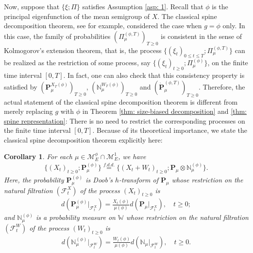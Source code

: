 \documentclass[12pt,a4paper]{amsart}
\newtheorem{cro}[thm]{Corollary}
\theoremstyle{definition}
\numberwithin{equation}{section}
\begin{document}
Now, suppose that $\{\xi; \Pi\}$ satisfies Assumption \ref{asp: 1}.
Recall that $\phi$ is the principal eigenfunction of the mean semigroup of $X$.
The classical spine decomposition theorem, see 
\cite{EckhoffKyprianouWinkel2015Spines, EnglanderKyprianou2004Local, LiuRenSong2009Llog} for example, 
considered the case when $g = \phi$ only.
In this case, the family of probabilities $(\Pi_{\mu}^{(\phi,T)})_{T\geq 0}$ is consistent in the sense of Kolmogorov's extension theorem, that is, the process $\{(\xi_t)_{0\leq t\leq T}; \Pi_{\mu}^{(\phi,T)} \}$ can be realized as the restriction of some process, say $\{(\xi_t)_{t\geq 0}; \Pi_{\mu}^{(\phi)}\}$,	on the finite time interval $[0,T]$.
In fact, one can also check that this consistency property is satisfied by  $(\mathbf P_\mu^{X_T(\phi)} )_{T\geq 0}$, $(\mathbb N^{W_T(\phi)}_\mu)_{T\geq 0}$ and $(\dot {\mathbf P}^{(\phi,T)}_\mu)_{T\geq 0}$.
Therefore, the actual statement of the classical spine decomposition theorem is different from merely replacing $g$ with $\phi$ in Theorem \ref{thm: size-biased decomposition} and \ref{thm: spine representation}:
There is no need to restrict the corresponding processes on the finite time interval $[0,T]$.
Because of its theoretical importance, we state the classical spine decomposition theorem explicitly here:
	
\begin{cro}
	For each $\mu \in \mathcal M_E^\phi \cap \mathcal M_E^1$, we have
  \begin{align}
    \{(X_t)_{t\geq 0}; \mathbf P_\mu^{(\phi)}\}
    \overset{f.d.d.}{=} \{(X_t + W_t)_{t\geq 0}; \mathbf P_\mu \otimes \mathbb N^{(\phi)}_\mu\}.
  \end{align}
	Here, the probability $\mathbf P_\mu^{(\phi)}$ is Doob's $h$-transform of $\mathbf P_\mu$ whose restriction on the natural filtration $(\mathscr F_t^X)$ of the process $(X_t)_{t\geq 0}$ is
  \begin{align}
    d ( \mathbf P_\mu^{(\phi)}|_{\mathscr F_t^X})
    = \frac{X_t(\phi)}{ \mu(\phi)} d(\mathbf P_\mu|_{\mathscr F_t^X}),
    \quad t\geq 0;
  \end{align}
	and $\mathbb N_\mu^{(\phi)}$ is a probability measure on $\mathbb W$ whose restriction on the natural filtration $(\mathscr F_t^W)$ of the process $(W_t)_{t\geq 0}$ is
  \begin{align}
    d(\mathbb N_\mu^{(\phi)} |_{\mathscr F^W_t}  )
    = \frac{W_t(\phi)}{\mu(\phi)} d(\mathbb N_\mu |_{\mathscr F^W_t}  ),
    \quad t\geq 0.
  \end{align}
\end{cro}
\end{document}
